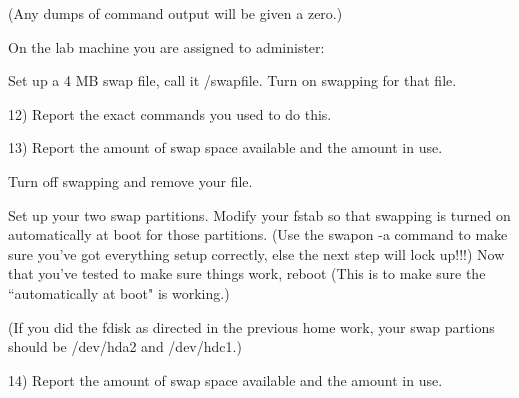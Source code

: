 (Any dumps of command output will be given a zero.)

On the lab machine you are assigned to administer:

Set up a 4 MB swap file, call it {\ltt{}/swapfile}.
Turn on swapping for that file.

12) Report the exact commands you used to do this.

13) Report the amount of swap space available and the amount in use.

Turn off swapping and remove your file.

Set up your two swap partitions.
Modify your {\ltt{}fstab} so that swapping is turned on automatically
at boot for those partitions.
(Use the {\ltt{}swapon -a} command to make sure you've got everything
setup correctly, else the next step will lock up!!!)
Now that you've tested to make sure things work, reboot
(This is to make sure the ``automatically at boot" is working.)

(If you did the {\ltt{}fdisk} as directed in the previous home work,
your swap partions should be {\ltt{}/dev/hda2} and {\ltt{}/dev/hdc1}.)

14) Report the amount of swap space available and the amount in use.

\bye
